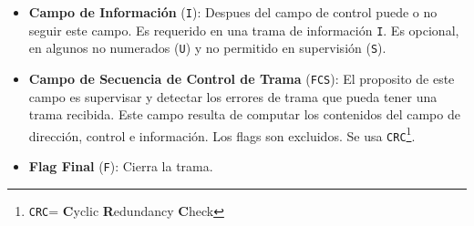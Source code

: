 \begin{itemize}
\begin{itemize}
\begin{itemize}
\end{itemize}
\end{itemize}
\item \textbf{Campo de Información} (\texttt{I}): Despues del campo de control puede o no seguir este campo. Es requerido en una trama de información \texttt{I}. Es opcional, en algunos no numerados (\texttt{U}) y no permitido en supervisión (\texttt{S}).
\item \textbf{Campo de Secuencia de Control de Trama} (\texttt{FCS}): El proposito de este campo es supervisar y detectar los errores de trama que pueda tener una trama recibida. Este campo resulta de computar los contenidos del campo de dirección, control e información. Los flags son excluidos. Se usa \texttt{CRC}\footnote{\texttt{CRC}= \textbf{C}yclic \textbf{R}edundancy \textbf{C}heck}.
\item \textbf{Flag Final} (\texttt{F}): Cierra la trama.
\end{itemize}